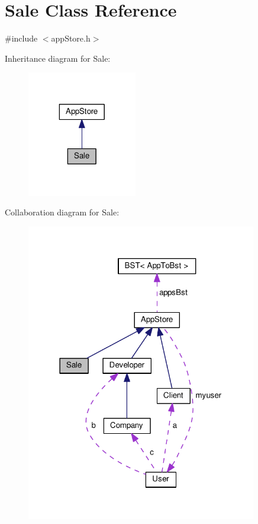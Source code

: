 \hypertarget{class_sale}{\section{Sale Class Reference}
\label{class_sale}
}


{\ttfamily \#include $<$app\-Store.\-h$>$}



Inheritance diagram for Sale\-:
\nopagebreak
\begin{figure}[H]
\begin{center}
\leavevmode
\includegraphics[width=136pt]{class_sale__inherit__graph}
\end{center}
\end{figure}


Collaboration diagram for Sale\-:
\nopagebreak
\begin{figure}[H]
\begin{center}
\leavevmode
\includegraphics[width=285pt]{class_sale__coll__graph}
\end{center}
\end{figure}
